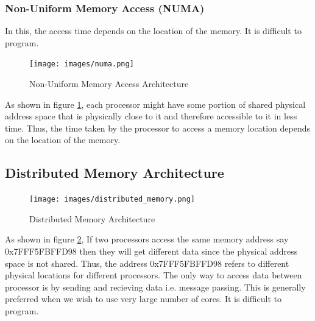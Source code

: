 \documentclass[12pt]{article}
\begin{document}
\subsubsection{Non-Uniform Memory Access (NUMA)}
In this, the access time depends on the location of the memory. It is difficult to program.
\begin{figure}[H]
    \centering
    \texttt{[image: images/numa.png]}
    \caption{Non-Uniform Memory Access Architecture}
    \label{fig:numa}
\end{figure}
As shown in figure \ref{fig:numa}, each processor might have some portion of shared physical address space that is physically close to it and
therefore accessible to it in less time. Thus, the time taken by the processor to access a memory location depends on the location of the memory.

\subsection{Distributed Memory Architecture}
\begin{figure}[H]
    \centering
    \texttt{[image: images/distributed\_memory.png]}
    \caption{Distributed Memory Architecture}
    \label{fig:distributed_memory}
\end{figure}
As shown in figure \ref{fig:distributed_memory},
If two processors access the same memory address say 0x7FFF5FBFFD98 then they will get different data since 
the physical address space is not shared. Thus, the address 0x7FFF5FBFFD98 refers to different physical locations for different processors.
The only way to access data between processor is by sending and recieving data i.e. message passing.
This is generally preferred when we wish to use very large number of cores.
It is difficult to program.
\end{document}
